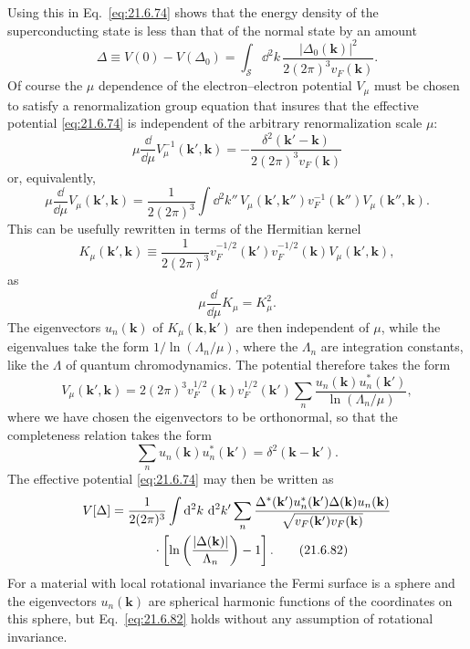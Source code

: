 Using this in Eq.~\eqref{eq:21.6.74} shows that the energy density of the superconducting state is less than that of the normal state by an amount
\begin{equation}
\Delta\equiv V(0)-V(\Delta_0)
=\int_{\mathcal S}\dd^2k\,
\frac{|\Delta_0(\mathbf k)|^2}{2(2\pi)^3v_F(\mathbf k)}.
\tag{21.6.76}\label{eq:21.6.76}
\end{equation}
Of course the $\mu$ dependence of the electron--electron potential $V_\mu$ must be chosen to satisfy a renormalization group equation that insures that the effective potential \eqref{eq:21.6.74} is independent of the arbitrary renormalization scale $\mu$:
\[
\mu\frac{\dd}{\dd\mu}V_\mu^{-1}(\mathbf k',\mathbf k)
=-\frac{\delta^2(\mathbf k'-\mathbf k)}
{2(2\pi)^3v_F(\mathbf k)}
\]
or, equivalently,
\begin{equation}
\mu\frac{\dd}{\dd\mu}V_\mu(\mathbf k',\mathbf k)
=\frac{1}{2(2\pi)^3}
\int \dd^2k''\,
V_\mu(\mathbf k',\mathbf k'')
v_F^{-1}(\mathbf k'')
V_\mu(\mathbf k'',\mathbf k).
\tag{21.6.77}\label{eq:21.6.77}
\end{equation}
This can be usefully rewritten in terms of the Hermitian kernel
\begin{equation}
K_\mu(\mathbf k',\mathbf k)
\equiv\frac{1}{2(2\pi)^3}
v_F^{-1/2}(\mathbf k')v_F^{-1/2}(\mathbf k)
V_\mu(\mathbf k',\mathbf k),
\tag{21.6.78}\label{eq:21.6.78}
\end{equation}
as
\begin{equation}
\mu\frac{\dd}{\dd\mu}K_\mu=K_\mu^2.
\tag{21.6.79}\label{eq:21.6.79}
\end{equation}
The eigenvectors $u_n(\mathbf k)$ of $K_\mu(\mathbf k,\mathbf k')$ are then independent of $\mu$, while the eigenvalues take the form $1/\ln(\Lambda_n/\mu)$, where the $\Lambda_n$ are integration constants, like the $\Lambda$ of quantum chromodynamics. The potential therefore takes the form
\begin{equation}
V_\mu(\mathbf k',\mathbf k)
=2(2\pi)^3v_F^{1/2}(\mathbf k)v_F^{1/2}(\mathbf k')
\sum_n
\frac{u_n(\mathbf k)u_n^*(\mathbf k')}
{\ln(\Lambda_n/\mu)},
\tag{21.6.80}\label{eq:21.6.80}
\end{equation}
where we have chosen the eigenvectors to be orthonormal, so that the completeness relation takes the form
\begin{equation}
\sum_n u_n(\mathbf k)u_n^*(\mathbf k')
=\delta^2(\mathbf k-\mathbf k').
\tag{21.6.81}\label{eq:21.6.81}
\end{equation}
The effective potential \eqref{eq:21.6.74} may then be written as
\begin{align}
V[\Delta]
={}&\frac{1}{2(2\pi)^3}
\int \mathop{}\!\mathrm{d}^2k\,\mathop{}\!\mathrm{d}^2k'\sum_n
\frac{
\Delta^*(\mathbf k')u_n^*(\mathbf k')
\Delta(\mathbf k)u_n(\mathbf k)}
{\sqrt{v_F(\mathbf k')v_F(\mathbf k)}}
\notag\\
&\qquad\cdot
\left[
\ln\left(\frac{|\Delta(\mathbf k)|}{\Lambda_n}\right)-1
\right].
\tag{21.6.82}\label{eq:21.6.82}
\end{align}
For a material with local rotational invariance the Fermi surface is a sphere and the eigenvectors $u_n(\mathbf k)$ are spherical harmonic functions of the coordinates on this sphere, but Eq.~\eqref{eq:21.6.82} holds without any assumption of rotational invariance.

